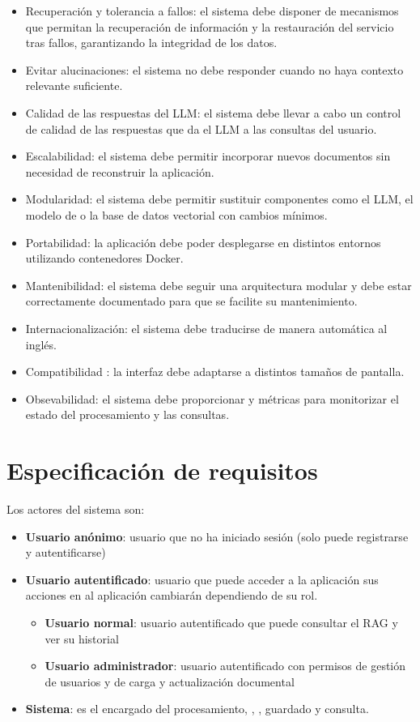 \begin{itemize}
	\item {} Recuperación y tolerancia a fallos: el sistema debe disponer de mecanismos que permitan la recuperación de información y la restauración del servicio tras fallos, garantizando la integridad de los datos.
	\item {} Evitar alucinaciones: el sistema no debe responder cuando no haya contexto relevante suficiente.
	\item {} Calidad de las respuestas del LLM: el sistema debe llevar a cabo un control de calidad de las respuestas que da el LLM a las consultas del usuario.
	\item {} Escalabilidad: el sistema debe permitir incorporar nuevos documentos sin necesidad de reconstruir la aplicación.
	\item {} Modularidad: el sistema debe permitir sustituir componentes como el LLM, el modelo de  o la base de datos vectorial con cambios mínimos.
	\item {} Portabilidad: la aplicación debe poder desplegarse en distintos entornos utilizando contenedores Docker.
	\item {} Mantenibilidad: el sistema debe seguir una arquitectura modular y debe estar correctamente documentado para que se facilite su mantenimiento.
	\item {} Internacionalización: el sistema debe traducirse de manera automática al inglés.
	\item {} Compatibilidad : la interfaz debe adaptarse a distintos tamaños de pantalla.
	\item {} Obsevabilidad: el sistema debe proporcionar  y métricas para monitorizar el estado del procesamiento y las consultas.
\end{itemize}

\section{Especificación de requisitos} \label{req:esp}

Los actores del sistema son:
\begin{itemize}
\tightlist
	\item \textbf{Usuario anónimo}: usuario que no ha iniciado sesión (solo puede registrarse y autentificarse)
	\item \textbf{Usuario autentificado}: usuario que puede acceder a la aplicación sus acciones en al aplicación cambiarán dependiendo de su rol. 
	\begin{itemize}
	\tightlist
	 	\item \textbf{Usuario normal}: usuario autentificado que puede consultar el RAG y ver su historial
	 	\item \textbf{Usuario administrador}: usuario autentificado con permisos de gestión de usuarios y de carga y actualización documental
	 \end{itemize}
	 \item \textbf{Sistema}: es el encargado del procesamiento, , , guardado y consulta. 
\end{itemize}

